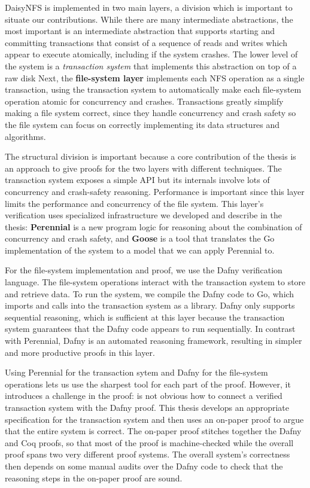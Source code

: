 DaisyNFS is implemented in two main layers, a division which is important to
situate our contributions. While there are many intermediate abstractions, the
most important is an intermediate abstraction that supports starting and
committing transactions that consist of a sequence of reads and writes which
appear to execute atomically, including if the system crashes. The lower level
of the system is a \emph{transaction system} that implements this abstraction on
top of a raw disk Next, the \textbf{file-system layer} implements each NFS
operation as a single transaction, using the transaction system to automatically
make each file-system operation atomic for
concurrency and crashes. Transactions greatly simplify making a file
system correct, since they handle concurrency and crash safety so the
file system can focus on correctly implementing its data structures and
algorithms.

The structural division is important because a core contribution of the thesis
is an approach to give proofs for the two layers with different techniques.
The transaction
system exposes a simple API but its internals involve lots of
concurrency and crash-safety reasoning. Performance is important since
this layer limits the performance and concurrency of the file system.
This layer's verification uses specialized infrastructure we developed
and describe in the thesis: \textbf{Perennial} is a new program logic
for reasoning about the combination of concurrency and crash safety, and
\textbf{Goose} is a tool that translates the Go implementation of the
system to a model that we can apply Perennial to.

For the file-system implementation and proof, we use the Dafny
verification language. The file-system operations interact with the
transaction system to store and retrieve data. To run the system, we
compile the Dafny code to Go, which imports and calls into the
transaction system as a library. Dafny only supports sequential
reasoning, which is sufficient at this layer because the transaction
system guarantees that the Dafny code appears to run sequentially. In contrast
with Perennial, Dafny is an automated reasoning framework, resulting in simpler
and more productive proofs in this layer.

Using Perennial for the transaction sytem and Dafny for the file-system
operations lets us use the sharpest tool for each part of the proof. However, it
introduces a challenge in the proof: is not obvious how to connect a verified
transaction system with the Dafny proof. This thesis develops an appropriate
specification for the transaction system and then uses an on-paper proof to
argue that the entire system is correct. The on-paper proof stitches together
the Dafny and Coq proofs, so that most of the proof is machine-checked while the
overall proof spans two very different proof systems. The overall system's
correctness then depends on some manual audits over the Dafny code to check that
the reasoning steps in the on-paper proof are sound.

